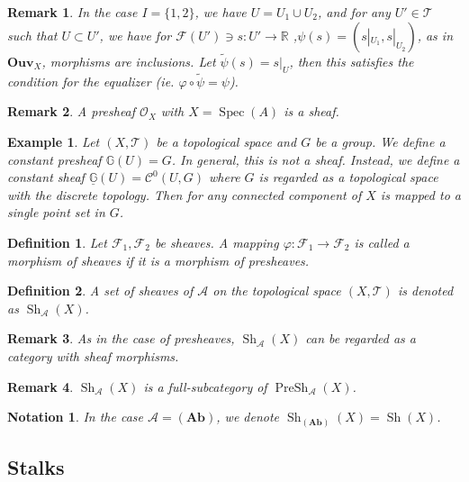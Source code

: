 \documentclass{article}
\newtheorem{definition}{Definition}[section]
\newtheorem{notation}{Notation}[section]
\newtheorem{remark}{Remark}[section]
\newtheorem{example}{Example}[section]
\numberwithin{equation}{section}
\DeclareMathOperator{\Spec}{Spec}
\DeclareMathOperator{\PreSh}{PreSh}
\DeclareMathOperator{\Sh}{Sh}
\begin{document}
\begin{remark}
In the case $I=\{1,2\}$, we have $U=U_1\cup U_2$, and for any $U'\in\mathcal{T}$ such that $U\subset U'$, we have for $\mathcal{F}(U')\ni s:U'\to\mathbb{R}$ ,$\psi(s) = (s|_{U_1},s|_{U_2})$, as in $\mathbf{Ouv}_X$, morphisms are inclusions. Let $\tilde{\psi}(s) = s|_{U}$, then this satisfies the condition for the equalizer (ie. $\varphi\circ\tilde{\psi}=\psi$). 
\end{remark}

\begin{remark}
A presheaf $\mathcal{O}_X$ with $X=\Spec(A)$ is a sheaf.
\end{remark}

\begin{example}
Let $(X,\mathcal{T})$ be a topological space and $G$ be a group. We define a constant presheaf $\mathbb{G}(U) = G$. In general, this is not a sheaf. Instead, we define a constant sheaf $\underline{\mathbb{G}}(U) = \mathcal{C}^0(U,G)$ where $G$ is regarded as a topological space with the discrete topology. Then for any connected component of $X$ is mapped to a single point set in $G$.
\end{example}

\begin{definition}
Let $\mathcal{F}_1,\mathcal{F}_2$ be sheaves. A mapping $\varphi:\mathcal{F}_1\to\mathcal{F}_2$ is called a morphism of sheaves if it is a morphism of presheaves.
\end{definition}

\begin{definition}
A set of sheaves of $\mathcal{A}$ on the topological space $(X,\mathcal{T})$ is denoted as $\Sh_{\mathcal{A}}(X)$.
\end{definition}

\begin{remark}
As in the case of presheaves, $\Sh_\mathcal{A}(X)$ can be regarded as a category with sheaf morphisms.
\end{remark}

\begin{remark}
$\Sh_{\mathcal{A}}(X)$ is a full-subcategory of $\PreSh_{\mathcal{A}}(X)$.
\end{remark}

\begin{notation}
In the case $\mathcal{A}=(\mathbf{Ab})$, we denote $\Sh_{(\mathbf{Ab})}(X) = \Sh(X)$. 
\end{notation}

\subsection{Stalks}
\end{document}
